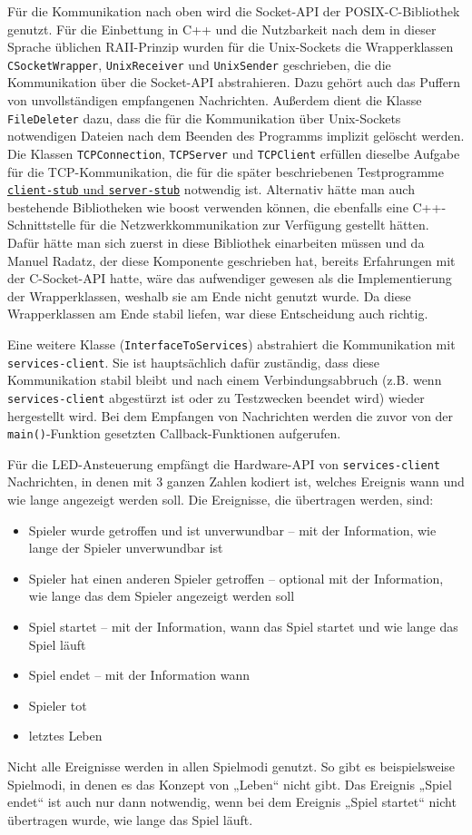 Für die Kommunikation nach oben wird die Socket-API der POSIX-C-Bibliothek genutzt.
Für die Einbettung in C++ und die Nutzbarkeit nach dem in dieser Sprache üblichen RAII-Prinzip
wurden für die Unix-Sockets die Wrapperklassen \texttt{CSocketWrapper}, \texttt{UnixReceiver} und
\texttt{UnixSender} geschrieben, die die Kommunikation über die Socket-API abstrahieren.
Dazu gehört auch das Puffern von unvollständigen empfangenen Nachrichten.
Außerdem dient die Klasse \texttt{FileDeleter} dazu, dass die für die Kommunikation über
Unix-Sockets notwendigen Dateien nach dem Beenden des Programms implizit gelöscht werden.
Die Klassen \texttt{TCPConnection}, \texttt{TCPServer} und \texttt{TCPClient} erfüllen dieselbe
Aufgabe für die TCP-Kommunikation, die für die später beschriebenen Testprogramme
\hyperref[client-stub-und-server-stub]{\texttt{client-stub} und \texttt{server-stub}} notwendig ist.
Alternativ hätte man auch bestehende Bibliotheken wie boost verwenden können, die ebenfalls eine
C++-Schnittstelle für die Netzwerkkommunikation zur Verfügung gestellt hätten.
Dafür hätte man sich zuerst in diese Bibliothek einarbeiten müssen und da Manuel Radatz, der diese
Komponente geschrieben hat, bereits Erfahrungen mit der C-Socket-API hatte, wäre das aufwendiger
gewesen als die Implementierung der Wrapperklassen, weshalb sie am Ende nicht genutzt wurde.
Da diese Wrapperklassen am Ende stabil liefen, war diese Entscheidung auch richtig.

Eine weitere Klasse (\texttt{InterfaceToServices}) abstrahiert die Kommunikation mit
\texttt{services-client}.
Sie ist hauptsächlich dafür zuständig, dass diese Kommunikation stabil bleibt und nach einem
Verbindungsabbruch (z.B. wenn \texttt{services-client} abgestürzt ist oder zu Testzwecken beendet
wird) wieder hergestellt wird.
Bei dem Empfangen von Nachrichten werden die zuvor von der \texttt{main()}-Funktion gesetzten
Callback-Funktionen aufgerufen.

Für die LED-Ansteuerung empfängt die Hardware-API von \texttt{services-client} Nachrichten, in denen
mit 3 ganzen Zahlen kodiert ist, welches Ereignis wann und wie lange angezeigt werden soll.
Die Ereignisse, die übertragen werden, sind:
\begin{itemize}
  \item
    Spieler wurde getroffen und ist unverwundbar – mit der Information, wie lange der Spieler
    unverwundbar ist
  \item
    Spieler hat einen anderen Spieler getroffen – optional mit der Information, wie lange das dem
    Spieler angezeigt werden soll
  \item
    Spiel startet – mit der Information, wann das Spiel startet und wie lange das Spiel läuft
  \item
    Spiel endet – mit der Information wann
  \item
    Spieler tot
  \item
    letztes Leben
\end{itemize}
Nicht alle Ereignisse werden in allen Spielmodi genutzt.
So gibt es beispielsweise Spielmodi, in denen es das Konzept von „Leben“ nicht gibt.
Das Ereignis „Spiel endet“ ist auch nur dann notwendig, wenn bei dem Ereignis „Spiel startet“ nicht
übertragen wurde, wie lange das Spiel läuft.

